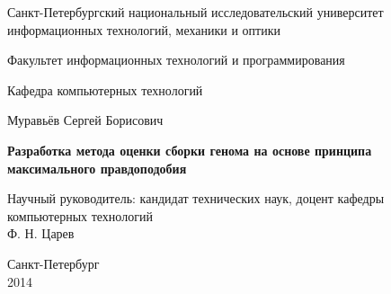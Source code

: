 \pagestyle{title}

\begin{center}
Санкт-Петербургский национальный исследовательский университет \\ информационных технологий, механики и оптики

\vspace{2cm}

Факультет информационных технологий и программирования

Кафедра компьютерных технологий

\vspace{3cm}

{\Large Муравьёв Сергей Борисович}

\vspace{2cm}

\vbox{\LARGE\bfseries
Разработка метода оценки сборки генома на основе принципа максимального правдоподобия
}

\vspace{4cm}

{\Large Научный руководитель: кандидат технических наук, доцент кафедры компьютерных технологий\\
Ф. Н. Царев}

\vspace{6cm}

Санкт-Петербург\\ 2014
\end{center}
